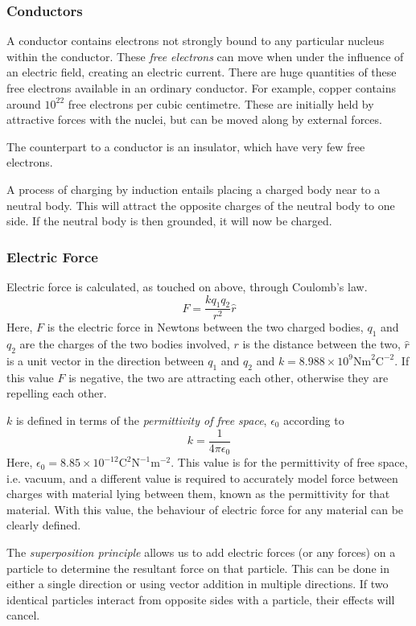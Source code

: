 \documentclass[12pt]{report}
\begin{document}
\begin{flushleft}
\subsubsection*{Conductors}
A conductor contains electrons not strongly bound to any particular nucleus 
within the conductor. These \textit{free electrons} can move when under the
influence of an electric field, creating an electric current. There are huge
quantities of these free electrons available in an ordinary conductor. For
example, copper contains around \(10^{22}\) free electrons per cubic 
centimetre. These are initially held by attractive forces with the nuclei, but
can be moved along by external forces.

\bigskip
The counterpart to a conductor is an insulator, which have very few free 
electrons.

\bigskip
A process of charging by induction entails placing a charged body near to a
neutral body. This will attract the opposite charges of the neutral body to one
side. If the neutral body is then grounded, it will now be charged.

\subsubsection*{Electric Force}
Electric force is calculated, as touched on above, through Coulomb's law.
\[F = \frac{kq_1q_2}{r^2}\hat{r}\]
Here, \(F\) is the electric force in Newtons between the two charged bodies,
\(q_1\) and \(q_2\) are the charges of the two bodies involved, \(r\) is the
distance between the two, \(\hat{r}\) is a unit vector in the direction
between \(q_1\) and \(q_2\) and 
\(k = 8.988\times10^9\mathrm{Nm}^2\mathrm{C}^{-2}\). If this value \(F\) is
negative, the two are attracting each other, otherwise they are repelling each
other.

\bigskip
\(k\) is defined in terms of the \textit{permittivity of free space}, 
\(\epsilon_0\) according to
\[k = \frac{1}{4\pi\epsilon_0}\]
Here, \(\epsilon_0 = 8.85\times10^{-12}\mathrm{C^2N^{-1}m^{-2}}\). This value
is for the permittivity of free space, i.e. vacuum, and a different value is
required to accurately model force between charges with material lying between
them, known as the permittivity for that material. With this value, the 
behaviour of electric force for any material can be clearly defined.

\bigskip
The \textit{superposition principle} allows us to add electric forces (or any
forces) on a particle to determine the resultant force on that particle. This
can be done in either a single direction or using vector addition in multiple
directions. If two identical particles interact from opposite sides with a
particle, their effects will cancel.


\end{flushleft}
\end{document}
